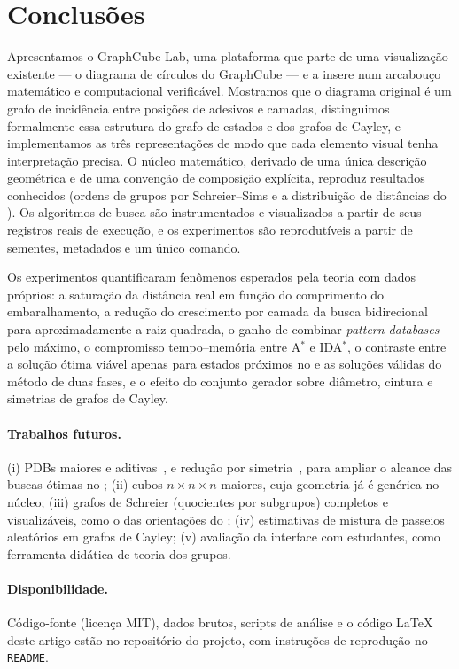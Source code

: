 \section{Conclusões}\label{sec:conclusoes}

Apresentamos o GraphCube Lab, uma plataforma que parte de uma visualização existente --- o diagrama de círculos do GraphCube --- e a insere num arcabouço matemático e computacional verificável. Mostramos que o diagrama original é um grafo de incidência entre posições de adesivos e camadas, distinguimos formalmente essa estrutura do grafo de estados e dos grafos de Cayley, e implementamos as três representações de modo que cada elemento visual tenha interpretação precisa. O núcleo matemático, derivado de uma única descrição geométrica e de uma convenção de composição explícita, reproduz resultados conhecidos (ordens de grupos por Schreier--Sims e a distribuição de distâncias do ). Os algoritmos de busca são instrumentados e visualizados a partir de seus registros reais de execução, e os experimentos são reprodutíveis a partir de sementes, metadados e um único comando.

Os experimentos quantificaram fenômenos esperados pela teoria com dados próprios: a saturação da distância real em função do comprimento do embaralhamento, a redução do crescimento por camada da busca bidirecional para aproximadamente a raiz quadrada, o ganho de combinar \textit{pattern databases} pelo máximo, o compromisso tempo--memória entre A$^*$ e IDA$^*$, o contraste entre a solução ótima viável apenas para estados próximos no  e as soluções válidas do método de duas fases, e o efeito do conjunto gerador sobre diâmetro, cintura e simetrias de grafos de Cayley.

\paragraph{Trabalhos futuros.} (i) PDBs maiores e aditivas~\cite{korf1997,felner2004}, e redução por simetria~\cite{rokicki2014}, para ampliar o alcance das buscas ótimas no ; (ii) cubos $n\times n\times n$ maiores, cuja geometria já é genérica no núcleo; (iii) grafos de Schreier (quocientes por subgrupos) completos e visualizáveis, como o das orientações do ; (iv) estimativas de mistura de passeios aleatórios em grafos de Cayley; (v) avaliação da interface com estudantes, como ferramenta didática de teoria dos grupos.

\paragraph{Disponibilidade.} Código-fonte (licença MIT), dados brutos, scripts de análise e o código \LaTeX{} deste artigo estão no repositório do projeto, com instruções de reprodução no \texttt{README}.
